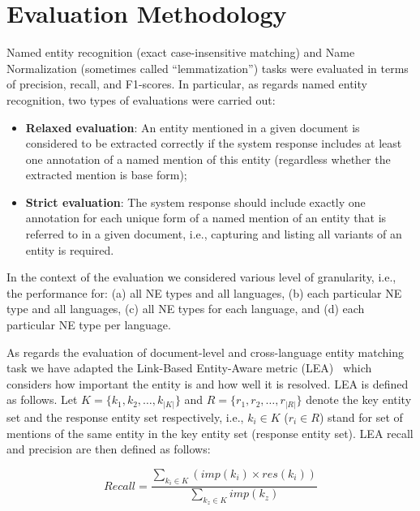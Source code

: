 \documentclass[11pt]{article}
\begin{document}
\section{Evaluation Methodology}
\label{sec:evaluation}

Named entity recognition (exact case-insensitive matching) and  Name Normalization (sometimes called “lemmatization”) tasks were evaluated in terms of precision, recall, and F1-scores. In particular, as regards named entity recognition, two types of evaluations were carried out:

\begin{itemize}

\item \textbf{Relaxed evaluation}: An entity mentioned in a given document is considered to be extracted correctly if the system response includes at least one annotation of a named mention of this entity (regardless whether the extracted mention is base form);

\item \textbf{Strict evaluation}: The system response should include exactly one annotation for each unique form of a named mention of an entity that is referred to in a given document, i.e., capturing and listing all variants of an entity is required.

\end{itemize}

In the context of the evaluation we considered various level of granularity, i.e., the performance for: 
(a) all NE types and all languages, (b) each particular NE type and all languages, (c) all NE types for 
each language, and (d) each particular NE type per language. 

As regards the evaluation of document-level and cross-language entity matching task we have adapted the 
Link-Based Entity-Aware metric (LEA)~\cite{DBLP:conf-acl-Moosavi016} which considers how important the entity is and how well it is resolved. LEA is defined as follows. Let $K = \{k_1,k_2,\ldots,k_{|K|} \}$ and $R = \{r_1,r_2,\ldots,r_{|R|} \}$ denote the key entity set and the response entity set respectively, i.e., $k_i \in K$ ($r_i \in R$) stand for set of mentions
of the same entity in the key entity set (response entity set). LEA recall and precision are then defined as follows:

\begin{equation*}
	\mathit{Recall} = \frac{\sum_{k_{i} \in K} (\mathit{imp}(k_i) \times \mathit{res}(k_{i}))}
              {\sum_{k_{z} \in K} imp(k_{z})}
\end{equation*}
\end{document}
